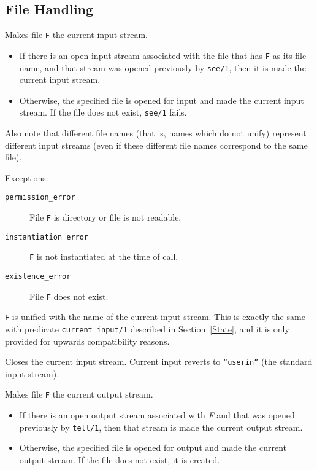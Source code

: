 \subsection{File Handling}
\begin{description}
    Makes file {\tt F} the current input stream. 
    \begin{itemize}
    \item If there is an open input stream associated with the file that 
          has {\tt F} as its file name, and that stream was opened previously
	  by {\tt see/1}, then it is made the current input stream.
    \item Otherwise, the specified file is opened for input and made the
          current input stream. If the file does not exist, {\tt see/1} 
	  fails.
    \end{itemize}
    Also note that different file names (that is, names which do not unify) 
    represent different input streams (even if these different file names 
    correspond to the same file).

    Exceptions:
    \begin{description}
    \item[{\tt permission\_error}]
    	File {\tt F} is directory or file is not readable. 
    \item[{\tt instantiation\_error}]
    	{\tt F} is not instantiated at the time of call. 
    \item[{\tt existence\_error}]
    	File {\tt F} does not exist. 
    \end{description}

    {\tt F} is unified with the name of the current input stream.
    This is exactly the same with predicate {\tt current\_input/1}
    described in Section~\ref{State}, and it is only provided for
    upwards compatibility reasons.

    Closes the current input stream. 
    Current input reverts to {\tt ``userin''} (the standard input stream).

    Makes file {\tt F} the current output stream. 
    \begin{itemize}
    \item If there is an open output stream associated with {\em F}  
          and that was opened previously 
          by {\tt tell/1}, then that stream is made the current output 
	  stream. 
    \item Otherwise, the specified file is opened for output and made the
          current output stream. If the file does not exist, it is created.
    \end{itemize}


\end{description}
